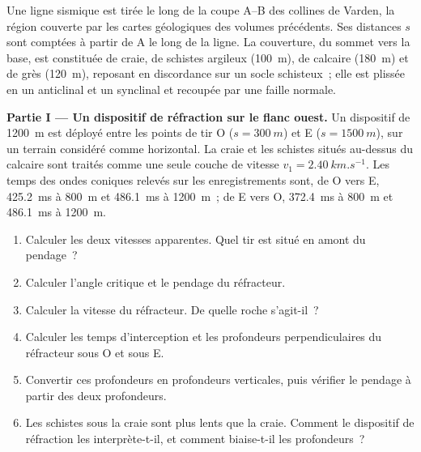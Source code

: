 \begin{problem}
\label{pb:b3:exploration-seismology:1}
Une ligne sismique est tirée le long de la coupe A--B des collines de Varden, la région
couverte par les cartes géologiques des volumes précédents. Ses distances $s$ sont comptées
à partir de A le long de la ligne. La couverture, du sommet vers la base, est constituée de craie, de schistes argileux (\qty{100}{m}),
de calcaire (\qty{180}{m}) et de grès (\qty{120}{m}), reposant en discordance sur
un socle schisteux~; elle est plissée en un anticlinal et un synclinal et recoupée par
une faille normale.

\medskip
\noindent\textbf{Partie I --- Un dispositif de réfraction sur le flanc ouest.} Un dispositif de
\qty{1200}{m} est déployé entre les points de tir O ($s = \qty{300}{m}$) et E
($s = \qty{1500}{m}$), sur un terrain considéré comme horizontal. La craie et les schistes situés au-dessus du
calcaire sont traités comme une seule couche de vitesse $v_1 = \qty{2.40}{km.s^{-1}}$.
Les temps des ondes coniques relevés sur les enregistrements sont, de O vers E, \qty{425.2}{ms} à
\qty{800}{m} et \qty{486.1}{ms} à \qty{1200}{m}~; de E vers O,
\qty{372.4}{ms} à \qty{800}{m} et \qty{486.1}{ms} à \qty{1200}{m}.
\begin{enumerate}
  \item Calculer les deux vitesses apparentes. Quel tir est situé en amont du pendage~?
  \item Calculer l'angle critique et le pendage du réfracteur.
  \item Calculer la vitesse du réfracteur. De quelle roche s'agit-il~?
  \item Calculer les temps d'interception et les profondeurs perpendiculaires du
        réfracteur sous O et sous E.
  \item Convertir ces profondeurs en profondeurs verticales, puis vérifier le pendage à partir des deux profondeurs.
  \item Les schistes sous la craie sont plus lents que la craie. Comment le dispositif
        de réfraction les interprète-t-il, et comment biaise-t-il les profondeurs~?
\end{enumerate}


\end{problem}
